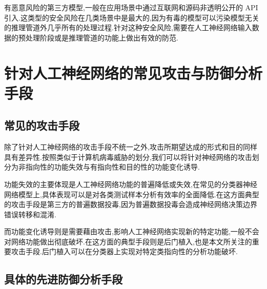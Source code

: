 有恶意风险的第三方模型,一般在应用场景中通过互联网和源码非透明公开的 API 引入.这类型的安全风险在几类场景中是最大的,因为有毒的模型可以污染模型无关的推理管道外几乎所有的处理过程.针对这种安全风险,需要在人工神经网络输入数据的预处理阶段或是推理管道的功能上做出有效的防范\cite{backdoordisanfang}.

\section{针对人工神经网络的常见攻击与防御分析手段}
\subsection{常见的攻击手段}
除了针对人工神经网络的攻击手段不统一之外,攻击所期望达成的形式和目的同样具有差异性.按照类似于计算机病毒威胁的划分,我们可以将针对神经网络的攻击划分为非指向性的功能失效与有指向性和目的性的功能变化诱导.

功能失效的主要体现是人工神经网络功能的普遍降低或失效,在常见的分类器神经网络模型上,具体表现可以是对各类测试样本分析有效率的全面降低.在这方面典型的攻击手段是第三方的普遍数据投毒,因为普遍数据投毒会造成神经网络决策边界错误转移和混淆.

而功能变化诱导则是需要藉由攻击,影响人工神经网络实现新的特定功能,一般不会对网络功能做出彻底破坏.在这方面的典型手段则是后门植入,也是本文所关注的重要攻击手段.后门植入可以在分类器上实现对特定类指向性的分析功能破坏.

\subsection{具体的先进防御分析手段}

